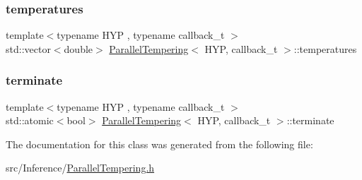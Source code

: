 \mbox{\label{class_parallel_tempering_a5aca1e6ca522986f183d61c91c94d21d}} 
\subsubsection{\texorpdfstring{temperatures}{temperatures}}
{\footnotesize\ttfamily template$<$typename H\+YP , typename callback\+\_\+t $>$ \\
std\+::vector$<$double$>$ \hyperlink{class_parallel_tempering}{Parallel\+Tempering}$<$ H\+YP, callback\+\_\+t $>$\+::temperatures}

\mbox{\label{class_parallel_tempering_acda523b375468743e7d8ac471af65285}} 
\subsubsection{\texorpdfstring{terminate}{terminate}}
{\footnotesize\ttfamily template$<$typename H\+YP , typename callback\+\_\+t $>$ \\
std\+::atomic$<$bool$>$ \hyperlink{class_parallel_tempering}{Parallel\+Tempering}$<$ H\+YP, callback\+\_\+t $>$\+::terminate}



The documentation for this class was generated from the following file\+:\begin{DoxyCompactItemize}
\item 
src/\+Inference/\hyperlink{_parallel_tempering_8h}{Parallel\+Tempering.\+h}\end{DoxyCompactItemize}
